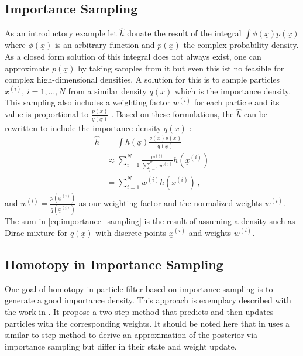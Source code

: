 \documentclass[a4paper]{IEEEtran}
\begin{document}
\subsection{Importance Sampling}
\label{ch:importance_sampling}
As an introductory example let $\hat{h}$ donate the result of the integral $\int \phi(\underline{x})p(\underline{x})$ where $\phi(\underline{x})$ is an arbitrary function and $p(\underline{x})$ the complex probability density. As a closed form solution of this integral does not always exist, one can approximate $p(\underline{x})$
by taking samples from it but even this ist no feasible for complex high-dimensional densities. A solution for this is to sample particles $\underline{x}^{(i)}$, $i = 1, \dotsc, N$ from a similar density $q(\underline{x})$ which is the importance density. This sampling also includes a weighting factor $w^{(i)}$ for each particle and its value 
is proportional to $\frac{p(\underline{x})}{q(\underline{x})}$ \cite{arulampalam2002}. Based on these formulations, the $\hat{h}$ can be rewritten to include the importance density $q(\underline{x})$ \cite{cappe2007b}:
\begin{equation}
    \begin{split}
        \hat{h} &= \int h(\underline{x})\frac{q(\underline{x})p(\underline{x})}{q(\underline{x})} \\
                &\approx \sum_{i=1}^{N} \frac{w^{(i)}}{\sum_{j=1}^{N} w^{(j)}}h(\underline{x}^{(i)}) \\
                &= \sum_{i=1}^{N} \bar{w}^{(i)} h(\underline{x}^{(i)})\,,
    \end{split}
    \label{eq:importance_sampling}
\end{equation}
and $w^{(i)}=\frac{p(\underline{x}^{(i)})}{q(\underline{x}^{(i)})}$ as our weighting factor and the normalized weights $\bar{w}^{(i)}$. The sum in \eqref{eq:importance_sampling} is the result of assuming a density such as Dirac mixture for $q(\underline{x})$ with discrete points $\underline{x}^{(i)}$ and weights $w^{(i)}$.

\subsection{Homotopy in Importance Sampling}
\label{ch:homotopy_importance_sampling}
One goal of homotopy in particle filter based on importance sampling is to generate a good importance density. This approach is exemplary described with the work in \cite{chlebek2016a}. It
propose a two step method that predicts and then updates particles with the corresponding weights. 
It should be noted here that in \cite{bunch2013a} uses a similar to step method to derive an approximation of the posterior via importance sampling but differ in their state and weight update.
\end{document}
